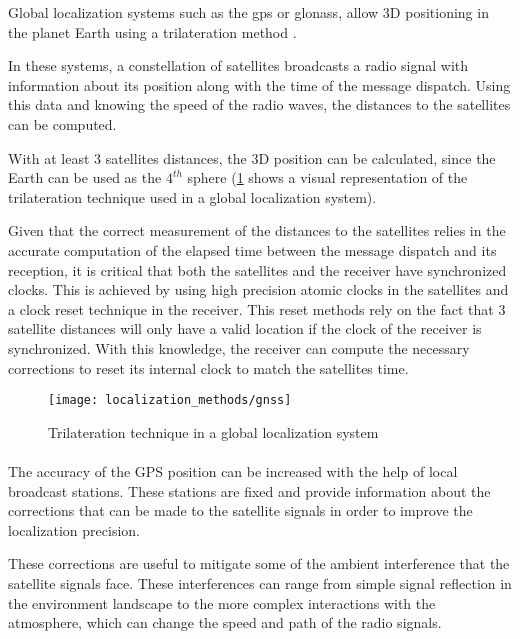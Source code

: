 Global localization systems such as the \gls{gps} or \gls{glonass}, allow 3D positioning in the planet Earth  using a trilateration method \cite{Knedlik2007}.

In these systems, a constellation of satellites broadcasts a radio signal with information about its position along with the time of the message dispatch. Using this data and knowing the speed of the radio waves, the distances to the satellites can be computed.

With at least 3 satellites distances, the 3D position can be calculated, since the Earth can be used as the ${4}^{th}$ sphere (\cref{fig:localization-methods_gnss} shows a visual representation of the trilateration technique used in a global localization system).

Given that the correct measurement of the distances to the satellites relies in the accurate computation of the elapsed time between the message dispatch and its reception, it is critical that both the satellites and the receiver have synchronized clocks. This is achieved by using high precision atomic clocks in the satellites and a clock reset technique in the receiver. This reset methods rely on the fact that 3 satellite distances will only have a valid location if the clock of the receiver is synchronized. With this knowledge, the receiver can compute the necessary corrections to reset its internal clock to match the satellites time.

\begin{figure}[ht]
	\centering
	\texttt{[image: localization\_methods/gnss]}
	\caption{Trilateration technique in a global localization system\protect\footnotemark}
	\label{fig:localization-methods_gnss}
\end{figure}

\paragraph{}

The accuracy of the GPS position can be increased with the help of local broadcast stations. These stations are fixed and provide information about the corrections that can be made to the satellite signals in order to improve the localization precision.

These corrections are useful to mitigate some of the ambient interference that the satellite signals face. These interferences can range from simple signal reflection in the environment landscape to the more complex interactions with the atmosphere, which can change the speed and path of the radio signals.

